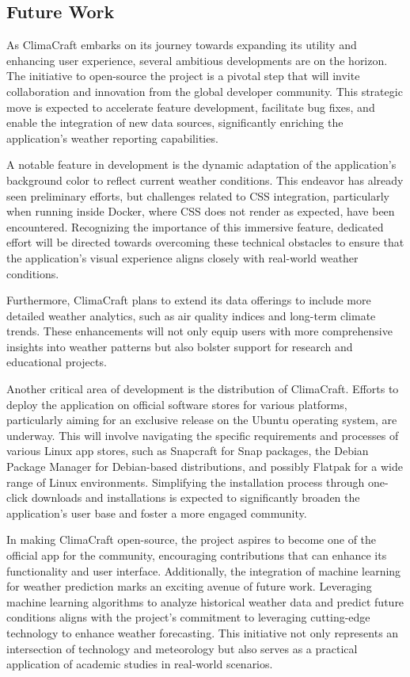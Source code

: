 \documentclass[sn-mathphys-num]{sn-jnl}%
\begin{document}
\subsection{Future Work}\label{sec5.2}
As ClimaCraft embarks on its journey towards expanding its utility and enhancing user experience, several ambitious developments are on the horizon. The initiative to open-source the project is a pivotal step that will invite collaboration and innovation from the global developer community. This strategic move is expected to accelerate feature development, facilitate bug fixes, and enable the integration of new data sources, significantly enriching the application's weather reporting capabilities.

A notable feature in development is the dynamic adaptation of the application's background color to reflect current weather conditions. This endeavor has already seen preliminary efforts, but challenges related to CSS integration, particularly when running inside Docker, where CSS does not render as expected, have been encountered. Recognizing the importance of this immersive feature, dedicated effort will be directed towards overcoming these technical obstacles to ensure that the application's visual experience aligns closely with real-world weather conditions.

Furthermore, ClimaCraft plans to extend its data offerings to include more detailed weather analytics, such as air quality indices and long-term climate trends. These enhancements will not only equip users with more comprehensive insights into weather patterns but also bolster support for research and educational projects.

Another critical area of development is the distribution of ClimaCraft. Efforts to deploy the application on official software stores for various platforms, particularly aiming for an exclusive release on the Ubuntu operating system, are underway. This will involve navigating the specific requirements and processes of various Linux app stores, such as Snapcraft for Snap packages, the Debian Package Manager for Debian-based distributions, and possibly Flatpak for a wide range of Linux environments. Simplifying the installation process through one-click downloads and installations is expected to significantly broaden the application's user base and foster a more engaged community.

In making ClimaCraft open-source, the project aspires to become one of the official app for the community, encouraging contributions that can enhance its functionality and user interface. Additionally, the integration of machine learning for weather prediction marks an exciting avenue of future work. Leveraging machine learning algorithms to analyze historical weather data and predict future conditions aligns with the project's commitment to leveraging cutting-edge technology to enhance weather forecasting. This initiative not only represents an intersection of technology and meteorology but also serves as a practical application of academic studies in real-world scenarios.
\end{document}
